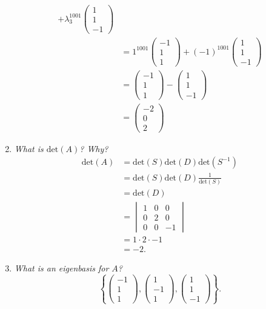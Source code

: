 \documentclass[12pt]{article}
\begin{document}
\begin{enumerate}[label=(\alph*)]
\begin{align*}
		+
		\lambda_{3}^{1001} \begin{pmatrix} 1 \\ 1 \\ -1 \end{pmatrix}
		\\
		&=
		1^{1001} \begin{pmatrix} -1 \\ 1 \\ 1 \end{pmatrix}
		+
		{(-1)}^{1001} \begin{pmatrix} 1 \\ 1 \\ -1 \end{pmatrix}
		\\
		&=
		\begin{pmatrix} -1 \\ 1 \\ 1 \end{pmatrix}
		-
		\begin{pmatrix} 1 \\ 1 \\ -1 \end{pmatrix}
		\\
		&=
		\boxed{
			\begin{pmatrix} -2 \\ 0 \\ 2 \end{pmatrix}
		}
	\end{align*}
	
	\item \textit{What is $\text{det}(A)$? Why?}
	\begin{align*}
		\text{det}(A)
		&= \text{det}(S) \text{det}(D) \text{det}(S^{-1}) \\
		&= \text{det}(S) \text{det}(D) \frac{1}{\text{det}(S)} \\
		&= \text{det}(D) \\
		&=
		\begin{vmatrix}
			1 & 0 & 0 \\
			0 & 2 & 0 \\
			0 & 0 & -1
		\end{vmatrix} \\
		&= 1 \cdot 2 \cdot -1 \\
		&= \boxed{-2}.
	\end{align*}
	
	\item \textit{What is an eigenbasis for $A$?}
	\begin{equation*}
		\boxed{
			\left\{
				\begin{pmatrix} -1 \\ 1 \\ 1 \end{pmatrix},
				\begin{pmatrix} 1 \\ -1 \\ 1 \end{pmatrix},
				\begin{pmatrix} 1 \\ 1 \\ -1 \end{pmatrix}
			\right\}.
		}
	\end{equation*}
\end{enumerate}
\end{document}
